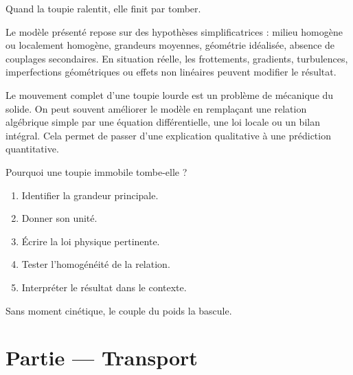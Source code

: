 \documentclass[11pt,a4paper]{article}
\begin{document}
\begin{odgbox}
Quand la toupie ralentit, elle finit par tomber.
\end{odgbox}

\begin{attentionbox}
Le modèle présenté repose sur des hypothèses simplificatrices : milieu homogène ou localement homogène, grandeurs moyennes, géométrie idéalisée, absence de couplages secondaires. En situation réelle, les frottements, gradients, turbulences, imperfections géométriques ou effets non linéaires peuvent modifier le résultat.
\end{attentionbox}

\begin{approfondissementbox}
Le mouvement complet d'une toupie lourde est un problème de mécanique du solide.
On peut souvent améliorer le modèle en remplaçant une relation algébrique simple par une équation différentielle, une loi locale ou un bilan intégral. Cela permet de passer d'une explication qualitative à une prédiction quantitative.
\end{approfondissementbox}

\begin{exercicebox}
Pourquoi une toupie immobile tombe-elle ?
\begin{enumerate}
  \item Identifier la grandeur principale.
  \item Donner son unité.
  \item Écrire la loi physique pertinente.
  \item Tester l'homogénéité de la relation.
  \item Interpréter le résultat dans le contexte.
\end{enumerate}
\end{exercicebox}

\begin{corrigebox}[Indication]
Sans moment cinétique, le couple du poids la bascule.
\end{corrigebox}


\section{Partie — Transport}


\end{document}
